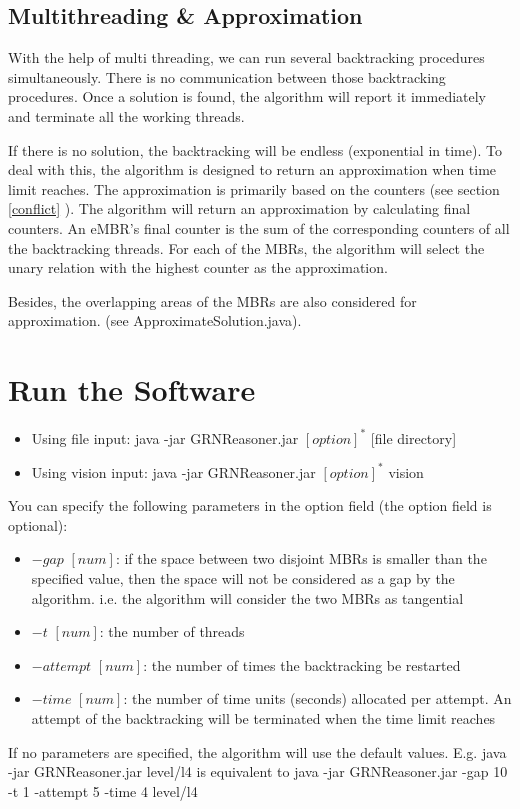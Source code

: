 \documentclass{article}
\begin{document}
\subsection{Multithreading \& Approximation}
With the help of multi threading, we can run several backtracking procedures simultaneously. There is no communication between those backtracking procedures. Once a solution is found, the algorithm will report it immediately and terminate all the working threads.

If there is no solution, the backtracking will be endless (exponential in time). To deal with this, the algorithm is designed to return an approximation when time limit reaches. The approximation is primarily based on the counters (see section \ref{conflict} ). The algorithm will return an approximation by calculating final counters. An eMBR's final counter is the sum of the corresponding counters of all the backtracking threads. For each of the MBRs, the algorithm will select the unary relation with the highest counter as the approximation. 

Besides, the overlapping areas of the MBRs are also considered for approximation. (see ApproximateSolution.java).   	






\section{Run the Software}
\begin{itemize}
\item Using file input: java -jar GRNReasoner.jar $[option]^*$ [file directory]
\item Using vision input: java -jar GRNReasoner.jar $[option]^*$ vision
\end{itemize}
You can specify the following parameters in the option field (the option field is optional):
\begin{itemize}
\item $-gap\,\,[num]$: if the space between two disjoint MBRs is smaller than the specified value, then the space will not be considered as a gap by the algorithm. i.e. the algorithm will consider the two MBRs as tangential
\item $-t\,\,[num]$: the number of threads 
\item $-attempt\,\,[num]$: the number of times the backtracking be restarted
\item $-time\,\,[num]$: the number of time units (seconds) allocated per attempt. An attempt of the backtracking will be terminated when the time limit reaches
\end{itemize}
If no parameters are specified, the algorithm will use the default values. E.g. java -jar GRNReasoner.jar level/l4 is equivalent to java -jar GRNReasoner.jar -gap 10 -t 1 -attempt 5 -time 4 level/l4
\end{document}
